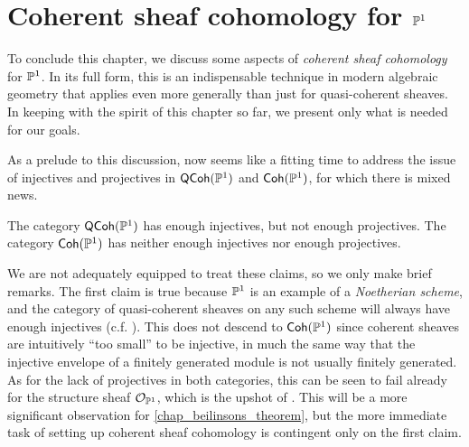 \section{Coherent sheaf cohomology for $\mathbb{P}^{{1}}$}
\label{sect_coh_sheaf_cohom}

To conclude this chapter, we discuss some aspects of \emph{coherent
sheaf cohomology} for $\mathbb{P}^{{1}}$.
In its full form, this is an indispensable technique in modern
algebraic geometry that applies even more generally than just for
quasi-coherent sheaves.
In keeping with the spirit of this chapter so far, we present only
what is needed for our goals.

As a prelude to this discussion, now seems like a fitting time to
address the issue of injectives and projectives in $\operatorname{\mathsf{QCoh}}(\mathbb{P}^{{1}})$
and $\operatorname{\mathsf{Coh}}(\mathbb{P}^{{1}})$, for which there is mixed news.

\begin{proposition}
  The category $\operatorname{\mathsf{QCoh}}(\mathbb{P}^{{1}})$ has enough injectives, but not
  enough projectives.
  The category $\operatorname{\mathsf{Coh}}(\mathbb{P}^{{1}})$ has neither enough injectives nor
  enough projectives.
\end{proposition}

We are not adequately equipped to treat these claims, so we only make
brief remarks.
The first claim is true because $\mathbb{P}^{{1}}$ is an example of a
\emph{Noetherian scheme}, and the category of quasi-coherent sheaves
on any such scheme will always have enough injectives (c.f.
\cite[Exercise~III.3.6(a)]{hartshorne}).
This does not descend to $\operatorname{\mathsf{Coh}}(\mathbb{P}^{{1}})$ since coherent sheaves are
intuitively ``too small'' to be injective, in much the same way that
the injective envelope of a finitely generated module is not usually
finitely generated.
As for the lack of projectives in both categories, this can be seen
to fail already for the structure sheaf $\mathcal{O}_{\mathbb{P}^{{1}}}$, which
is the upshot of \cite[Exercise~III.6.2]{hartshorne}.
This will be a more significant observation for
\cref{chap_beilinsons_theorem}, but the more immediate task of
setting up coherent sheaf cohomology is contingent only on the first claim.

